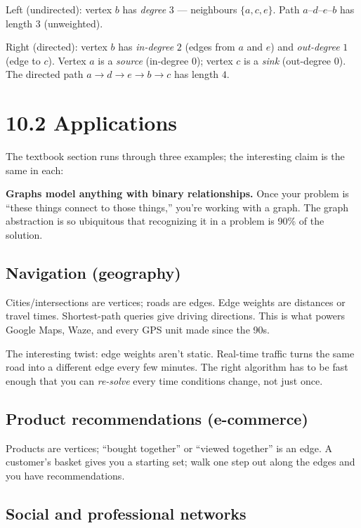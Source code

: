 \documentclass[11pt]{article}
\begin{document}
Left (undirected): vertex $b$ has \emph{degree} $3$ ---
neighbours $\{a, c, e\}$. Path $a$--$d$--$e$--$b$ has length $3$
(unweighted).

Right (directed): vertex $b$ has \emph{in-degree} $2$ (edges from
$a$ and $e$) and \emph{out-degree} $1$ (edge to $c$). Vertex $a$
is a \emph{source} (in-degree $0$); vertex $c$ is a \emph{sink}
(out-degree $0$). The directed path $a \to d \to e \to b \to c$
has length $4$.

\section{10.2 Applications}

The textbook section runs through three examples; the interesting claim is the same in each:

\begin{ideabox}
\textbf{Graphs model anything with binary relationships.} Once your problem is ``these things connect to those things,'' you're working with a graph. The graph abstraction is so ubiquitous that recognizing it in a problem is 90\% of the solution.
\end{ideabox}

\subsection*{Navigation (geography)}

Cities/intersections are vertices; roads are edges. Edge weights are distances or travel times. Shortest-path queries give driving directions. This is what powers Google Maps, Waze, and every GPS unit made since the 90s.

The interesting twist: edge weights aren't static. Real-time traffic turns the same road into a different edge every few minutes. The right algorithm has to be fast enough that you can \emph{re-solve} every time conditions change, not just once.

\subsection*{Product recommendations (e-commerce)}

Products are vertices; ``bought together'' or ``viewed together'' is an edge. A customer's basket gives you a starting set; walk one step out along the edges and you have recommendations.

\subsection*{Social and professional networks}
\end{document}
